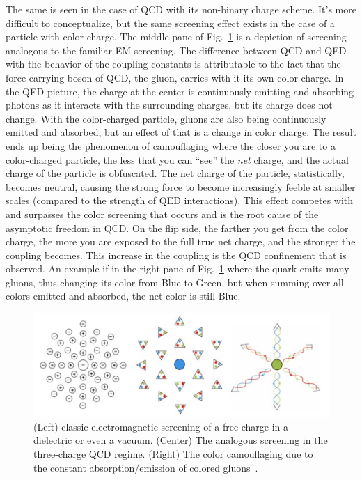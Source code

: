 The same is seen in the case of QCD with its non-binary charge scheme. It's more difficult to conceptualize, but the same screening effect exists in the case of a particle with color charge. The middle pane of Fig.~\ref{fig:screening-camo} is a depiction of screening analogous to the familiar EM screening. The difference between QCD and QED with the behavior of the coupling constants is attributable to the fact that the force-carrying boson of QCD, the gluon, carries with it its own color charge. In the QED picture, the charge at the center is continuously emitting and absorbing photons as it interacts with the surrounding charges, but its charge does not change. With the color-charged particle, gluons are also being continuously emitted and absorbed, but an effect of that is a change in color charge. The result ends up being the phenomenon of camouflaging where the closer you are to a color-charged particle, the less that you can ``see'' the \emph{net} charge, and the actual charge of the particle is obfuscated. The net charge of the particle, statistically, becomes neutral, causing the strong force to become increasingly feeble at smaller scales (compared to the strength of QED interactions). This effect competes with and surpasses the color screening that occurs and is the root cause of the asymptotic freedom in QCD. On the flip side, the farther you get from the color charge, the more you are exposed to the full true net charge, and the stronger the coupling becomes. This increase in the coupling is the QCD confinement that is observed. An example if in the right pane of Fig.~\ref{fig:screening-camo} where the quark emits many gluons, thus changing its color from Blue to Green, but when summing over all colors emitted and absorbed, the net color is still Blue.

\begin{figure}
	\centering
	\includegraphics[width=\textwidth]{figures/background/screening-camo.png}
	\caption{(Left) classic electromagnetic screening of a free charge in a dielectric or even a vacuum. (Center) The analogous screening in the three-charge QCD regime. (Right) The color camouflaging due to the constant absorption/emission of colored gluons~\cite{Quigg:1985ai}.}
	\label{fig:screening-camo}
\end{figure}

